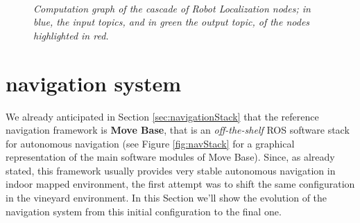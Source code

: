\begin{figure}
	\centering
	 \\
	\caption{\textit{Computation graph of the cascade of Robot Localization nodes; in blue, the input topics, and in green the output topic, of the nodes highlighted in red.}}
	\label{fig:cascadeRobotLocalization}
\end{figure}


\section{navigation system}\label{sec:navigationSystem}

We already anticipated in Section \ref{sec:navigationStack} that the reference navigation framework is \textbf{Move Base}, that is an \textit{off-the-shelf} \ac{ROS} software stack for autonomous navigation (see Figure \ref{fig:navStack} for a graphical representation of the main software modules of Move Base). Since, as already stated, this framework usually provides very stable autonomous navigation in indoor mapped environment, the first attempt was to shift the same configuration in the vineyard environment. In this Section we'll show the evolution of the navigation system from this initial configuration to the final one.


